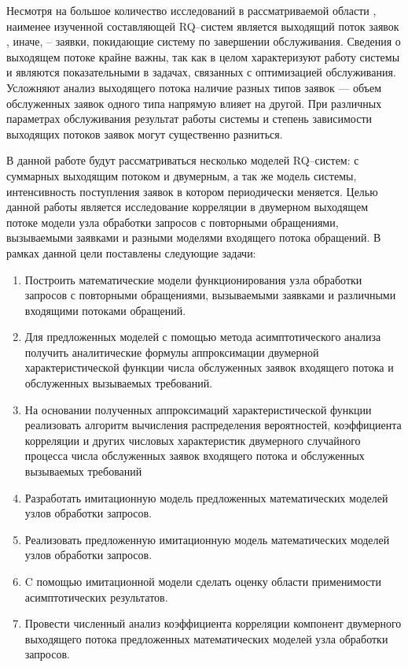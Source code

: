 Несмотря на большое количество исследований в рассматриваемой области \cite{artalejo2010mean,nazarov2017asymptotic,phung2019retrial,kulkarni1983queueing,paul2018retrial}, наименее изученной составляющей RQ--систем является выходящий поток заявок \cite{daley1976queueing}, иначе, -- заявки, покидающие систему по завершении обслуживания. Сведения о выходящем потоке крайне важны, так как в целом характеризуют работу системы и являются показательными в задачах, связанных с оптимизацией обслуживания. Усложняют анализ выходящего потока наличие разных типов заявок --- объем обслуженных заявок одного типа напрямую влияет на другой. При различных параметрах обслуживания результат работы системы и степень зависимости выходящих потоков заявок могут существенно разниться. 

В данной работе будут рассматриваться несколько моделей RQ--систем: с суммарных выходящим потоком и двумерным, а так же модель системы, интенсивность поступления заявок в котором периодически меняется. Целью данной работы является исследование корреляции в двумерном выходящем потоке модели узла обработки запросов с повторными обращениями, вызываемыми заявками и разными моделями входящего потока обращений. В рамках данной цели поставлены следующие задачи:
\begin{enumerate}
	\item Построить математические модели функционирования узла обработки запросов с повторными обращениями, вызываемыми заявками и различными входящими потоками обращений.
	\item Для предложенных моделей с помощью метода асимптотического анализа получить аналитические формулы аппроксимации двумерной характеристической функции числа обслуженных заявок входящего потока и обслуженных вызываемых требований. 
	\item На основании полученных аппроксимаций характеристической функции реализовать алгоритм вычисления распределения вероятностей, коэффициента корреляции и других числовых характеристик двумерного случайного процесса числа обслуженных заявок входящего потока и обслуженных вызываемых требований
	\item Разработать имитационную модель предложенных математических моделей узлов обработки запросов.
	\item Реализовать предложенную имитационную модель математических моделей узлов обработки запросов.
	\item C помощью имитационной модели сделать оценку области применимости асимптотических результатов.
	\item Провести численный анализ коэффициента корреляции компонент двумерного выходящего потока предложенных математических моделей узла обработки запросов.
\end{enumerate}


 \clearpage